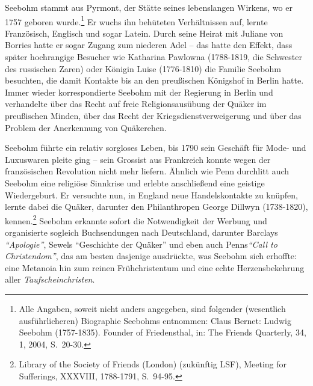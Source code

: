 \medskip

Seebohm stammt aus Pyrmont, der Stätte seines lebenslangen
Wirkens, wo er 1757 geboren wurde.\footnote{Alle Angaben, soweit nicht anders
angegeben, sind folgender (wesentlich
ausführlicheren) Biographie Seebohms entnommen: Claus Bernet: Ludwig Seebohm
(1757-1835). Founder of Friedensthal, in: The Friends Quarterly, 34, 1, 2004,
S.~20-30.} Er wuchs ihn behüteten Verhältnissen auf, lernte Französisch,
Englisch und sogar Latein. Durch seine Heirat mit Juliane von
Borries hatte er sogar Zugang zum niederen
Adel -- das hatte den Effekt, dass später
hochrangige Besucher wie Katharina Pawlowna
(1788-1819, die Schwester des russischen Zaren) oder Königin
Luise (1776-1810) die Familie Seebohm besuchten,
die damit Kontakte bis an den preußischen Königshof in Berlin hatte. Immer wieder korrespondierte
Seebohm mit der Regierung in Berlin und verhandelte über das Recht auf freie
Religionsausübung der Quäker im preußischen Minden, über das
Recht der Kriegsdienstverweigerung und
über das Problem der Anerkennung von Quäkerehen.

\medskip

Seebohm führte ein relativ sorgloses Leben, bis 1790 sein Geschäft für Mode- und
Luxuswaren pleite ging -- sein Grossist aus
Frankreich konnte wegen der französischen
Revolution nicht mehr liefern. Ähnlich wie Penn
durchlitt auch Seebohm eine religiöse Sinnkrise und erlebte
anschließend eine geistige Wiedergeburt. Er
versuchte nun, in England neue
Handelskontakte zu knüpfen, lernte dabei die Quäker,
darunter den Philanthropen George Dillwyn
(1738-1820), kennen.\footnote{Library of the Society of Friends (London)
(zukünftig LSF), Meeting for
Sufferings, XXXVIII, 1788-1791, S.~94-95.} Seebohm erkannte sofort die
Notwendigkeit der Werbung und organisierte sogleich Buchsendungen
nach Deutschland, darunter Barclays
\textit{"`Apologie"'}, Sewels "`Geschichte der Quäker"' und eben auch Penns\textit{"`Call to
Christendom"'}, das am besten dasjenige ausdrückte, was Seebohm sich erhoffte:
eine Metanoia hin zum reinen
Frühchristentum und eine echte
Herzensbekehrung aller
\textit{Taufscheinchristen}.

